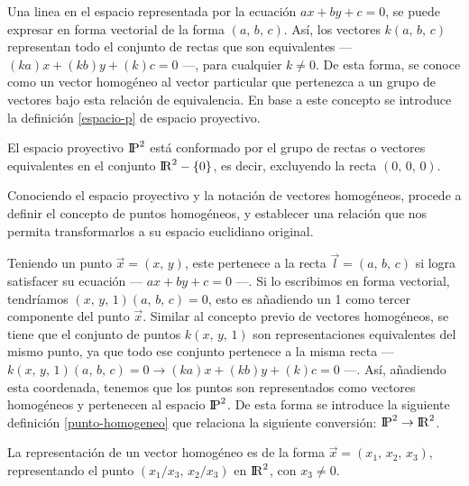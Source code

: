Una linea en el espacio representada por la ecuación $ax + by + c = 0$, se puede expresar en forma vectorial de la forma $(a,\, b,\, c)$. Así, los vectores $k(a,\, b,\, c)$ representan todo el conjunto de rectas que son equivalentes --- $(ka)x + (kb)y + (k)c = 0$ ---, para cualquier $k\neq0$. De esta forma, se conoce como un vector homogéneo al vector particular que pertenezca a un grupo de vectores bajo esta relación de equivalencia. En base a este concepto se introduce la definición \ref{espacio-p} de espacio proyectivo.

\begin{displayquote}
	\vspace{-1.5cm}
	\begin{definition}
		El espacio proyectivo ${\rm I\!P}^2$ está conformado por el grupo de rectas o vectores equivalentes en el conjunto ${\rm I\!R}^2-\{0\}$, es decir, excluyendo la recta $(0,\, 0,\, 0)$.
		\label{espacio-p}
	\end{definition}
\end{displayquote}

Conociendo el espacio proyectivo y la notación de vectores homogéneos, procede a definir el concepto de puntos homogéneos, y establecer una relación que nos permita transformarlos a su espacio euclidiano original. 

Teniendo un punto $\vec{x}=(x,\, y)$, este pertenece a la recta $\vec{l}=(a,\, b,\, c)$ si logra satisfacer su ecuación --- $ax + by + c = 0$ ---. Si lo escribimos en forma vectorial, tendríamos $(x,\, y,\, 1)(a,\, b,\, c) = 0$, esto es añadiendo un 1 como tercer componente del punto $\vec{x}$. Similar al concepto previo de vectores homogéneos, se tiene que el conjunto de puntos $k(x,\, y,\, 1)$ son representaciones equivalentes del mismo punto, ya que todo ese conjunto pertenece a la misma recta --- $k(x,\, y,\, 1)(a,\, b,\, c) = 0 \to (ka)x + (kb)y + (k)c = 0$ ---. Así, añadiendo esta coordenada, tenemos que los puntos son representados como vectores homogéneos y pertenecen al espacio ${\rm I\!P}^2$. De esta forma se introduce la siguiente definición \ref{punto-homogeneo} que relaciona la siguiente conversión: ${\rm I\!P}^2 \to {\rm I\!R}^2$.
\begin{displayquote}
	\vspace{-1.5cm}
	\begin{definition}
		La representación de un vector homogéneo es de la forma $\vec{x} = (x_1,\, x_2,\, x_3)$, representando el punto $(x_1/x_3,\, x_2/x_3)$ en ${\rm I\!R}^2$, con $x_3 \neq 0$.
	\end{definition} 
	\label{punto-homogeneo}
\end{displayquote}

